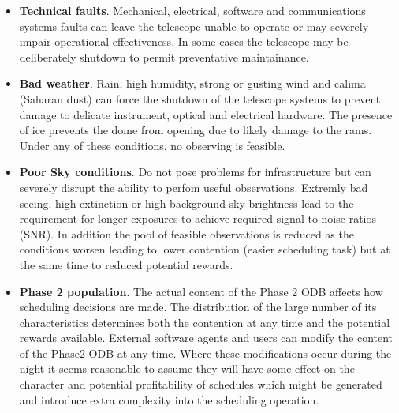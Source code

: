\begin{itemize}

\item {\bf Technical faults}. Mechanical, electrical, software and communications systems faults can leave the telescope unable to operate or may severely impair operational effectiveness. In some cases the telescope may be deliberately shutdown to permit preventative maintainance.

\item {\bf Bad weather}. Rain, high humidity, strong or gusting wind and calima (Saharan dust) can force the shutdown of the telescope systems to prevent damage to delicate instrument, optical and electrical hardware. The presence of ice prevents the dome from opening due to likely damage to the rams. Under any of these conditions, no observing is feasible. 


\item {\bf Poor Sky conditions}. Do not pose problems for infrastructure but can severely disrupt the ability to perfom useful observations. Extremly bad seeing, high extinction or high background sky-brightness lead to the requirement for longer exposures to achieve required signal-to-noise ratios (SNR). In addition the pool of feasible observations is reduced as the conditions worsen leading to lower contention (easier scheduling task) but at the same time to reduced potential rewards.

\item {\bf Phase 2 population}. The actual content of the Phase 2 ODB affects how scheduling decisions are made. The distribution of the large number of its characteristics determines both the contention at any time and the potential rewards available. External software agents and users can modify the content of the Phase2 ODB at any time. Where these modifications occur during the night it seems reasonable to assume they will have some effect on the character and potential profitability of schedules which might be generated and introduce extra complexity into the scheduling operation.

\end{itemize}
  
